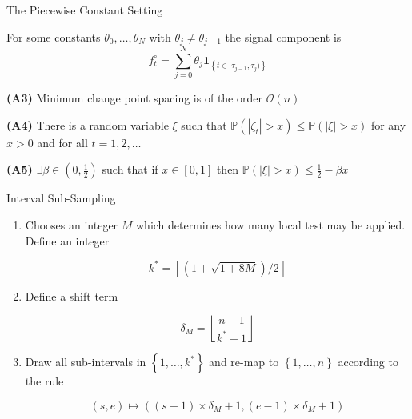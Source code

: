 \documentclass{beamer}
\begin{document}
\begin{frame}{The Piecewise Constant Setting}

\begin{exampleblock}{}
For some constants $\theta_0, \dots, \theta_{N}$ with $\theta_j \neq \theta_{j-1}$ the signal component is
\begin{equation*}
	f_t^\circ = \sum_{j = 0}^{N} \theta_j \mathbf{1}_{\left \{ t \in [\tau_{j-1}, \tau_j) \right \}}
\end{equation*}
\end{exampleblock}

\bigskip

\textbf{(A3)} Minimum change point spacing is of the order $\mathcal{O}(n)$ \\ 

\bigskip

\textbf{(A4)} There is a random variable $\xi$ such that $\mathbb{P} \left ( |\zeta_t| > x \right ) \leq \mathbb{P} \left ( |\xi| > x \right )$ for any $x>0$ and for all $t=1,2,\dots$ \\ 

\bigskip

\textbf{(A5)} $\exists \beta \in (0, \frac{1}{2})$ such that if $x \in [0,1]$ then $\mathbb{P} \left ( |\xi| > x \right ) \leq \frac{1}{2} - \beta x$

\end{frame}


\begin{frame}{Interval Sub-Sampling \citep{fryzlewicz2020narrowest}}

\bigskip 

\begin{enumerate}[<+->]
\item Chooses an integer $M$ which determines how many local test may be applied. Define an integer 

\begin{equation*}
	k^* = \left \lfloor \left ( 1+\sqrt{1+8M} \right ) / 2 \right \rfloor
\end{equation*}

\item Define a shift term

\begin{equation*}
	\delta_M = \left \lfloor \frac{n-1}{k^*-1} \right \rfloor
\end{equation*}

\item Draw all sub-intervals in $\left \{ 1, \dots, k^* \right \}$ and re-map to $\left \{ 1, \dots, n \right \}$ according to the rule

\begin{equation*}
\left (s, e \right ) \mapsto \left ( \left (s-1 \right )\times \delta_M + 1, \left (e-1 \right )\times \delta_M + 1 \right )
\end{equation*}
\end{enumerate}


\end{frame}
\end{document}
